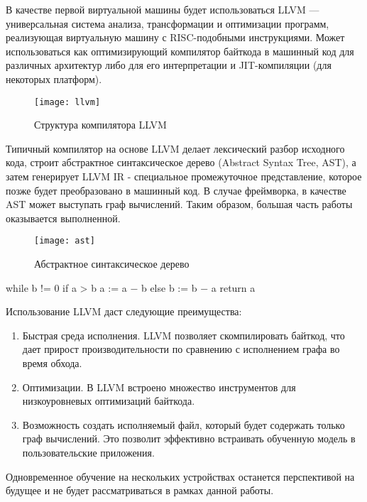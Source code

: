 В качестве первой виртуальной машины будет использоваться LLVM — универсальная система анализа, трансформации и оптимизации программ, реализующая виртуальную машину с RISC-подобными инструкциями. Может использоваться как оптимизирующий компилятор байткода в машинный код для различных архитектур либо для его интерпретации и JIT-компиляции (для некоторых платформ). 
\begin{figure}[h]
	\centering
	\texttt{[image: llvm]}
	\caption{Структура компилятора LLVM}
	\label{task:llvm}
\end{figure}
\par
Типичный компилятор на основе LLVM делает лексический разбор исходного кода, строит абстрактное синтаксическое дерево (Abstract Syntax Tree, AST), а затем генерирует LLVM IR - специальное промежуточное представление, которое позже будет преобразовано в машинный код. В случае фреймворка, в качестве AST может выступать граф вычислений. Таким образом, большая часть работы оказывается выполненной. 
\begin{figure}[h]
	\centering
	\texttt{[image: ast]}
	\caption{Абстрактное синтаксическое дерево}
	\label{task:ast}
\end{figure}
while b != 0
    if a > b
        a := a − b
    else
        b := b − a
return a
\par
Использование LLVM даст следующие преимущества:
\begin{enumerate}
	\item Быстрая среда исполнения. LLVM позволяет скомпилировать байткод, что дает прирост производительности по сравнению с исполнением графа во время обхода. 
	\item Оптимизации. В LLVM встроено множество инструментов для низкоуровневых оптимизаций байткода.
	\item Возможность создать исполняемый файл, который будет содержать только граф вычислений. Это позволит эффективно встраивать обученную модель в пользовательские приложения.
\end{enumerate}
\par
	Одновременное обучение на нескольких устройствах останется перспективой на будущее и не будет рассматриваться в рамках данной работы.

